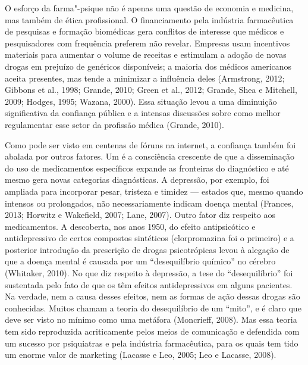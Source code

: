O esforço da farma"-psique não é apenas uma questão de economia e
medicina, mas também de ética profissional. O financiamento pela
indústria farmacêutica de pesquisas e formação biomédicas gera conflitos
de interesse que médicos e pesquisadores com frequência preferem não
revelar. Empresas usam incentivos materiais para aumentar o volume de
receitas e estimulam a adoção de novas drogas em prejuízo de genéricos
disponíveis; a maioria dos médicos americanos aceita presentes, mas
tende a minimizar a influência deles (Armstrong, 2012; Gibbons et al.,
1998; Grande, 2010; Green et al., 2012; Grande, Shea e Mitchell, 2009;
Hodges, 1995; Wazana, 2000). Essa situação levou a uma diminuição
significativa da confiança pública e a intensas discussões sobre como
melhor regulamentar esse setor da profissão médica (Grande, 2010).

Como pode ser visto em centenas de fóruns na internet, a confiança
também foi abalada por outros fatores. Um é a consciência crescente de
que a disseminação do uso de medicamentos específicos expande as
fronteiras do diagnóstico e até mesmo gera novas categorias
diagnósticas. A depressão, por exemplo, foi ampliada para incorporar
pesar, tristeza e timidez --- estados que, mesmo quando intensos ou
prolongados, não necessariamente indicam doença mental (Frances, 2013;
Horwitz e Wakefield, 2007; Lane, 2007). Outro fator diz respeito aos
medicamentos. A descoberta, nos anos 1950, do efeito antipsicótico e
antidepressivo de certos compostos sintéticos (clorpromazina foi o
primeiro) e a posterior introdução da prescrição de drogas psicotrópicas
levou à alegação de que a doença mental é causada por um ``desequilíbrio
químico'' no cérebro (Whitaker, 2010). No que diz respeito à depressão,
a tese do ``desequilíbrio'' foi sustentada pelo fato de que os  têm
efeitos antidepressivos em alguns pacientes. Na verdade, nem a causa
desses efeitos, nem as formas de ação dessas drogas são conhecidas.
Muitos chamam a teoria do desequilíbrio de um ``mito'', e é claro que
deve ser visto no mínimo como uma metáfora (Moncrieff, 2008). Mas essa
teoria tem sido reproduzida acriticamente pelos meios de comunicação e
defendida com um sucesso por psiquiatras e pela indústria farmacêutica,
para os quais tem tido um enorme valor de marketing (Lacasse e Leo,
2005; Leo e Lacasse, 2008).

